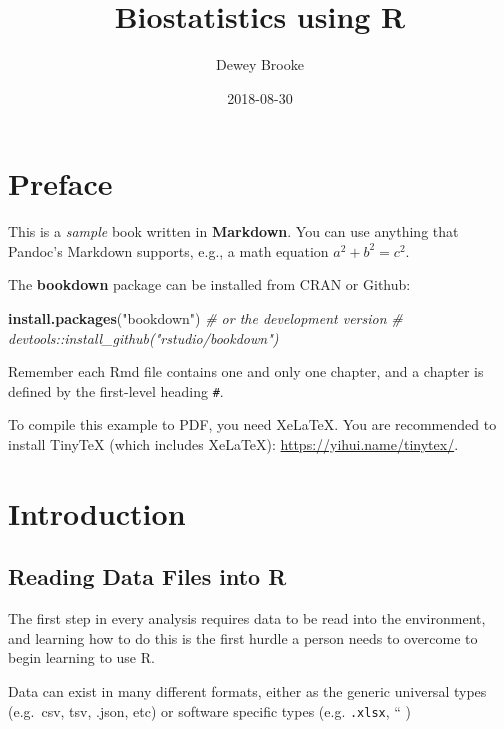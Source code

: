 \documentclass[12pt,]{article}
\title{Biostatistics using R}
\author{Dewey Brooke}
\date{2018-08-30}
\newenvironment{Shaded}{\begin{snugshade}}{\end{snugshade}}
\newcommand{\CommentTok}[1]{\textcolor[rgb]{0.56,0.35,0.01}{\textit{#1}}}
\newcommand{\KeywordTok}[1]{\textcolor[rgb]{0.13,0.29,0.53}{\textbf{#1}}}
\newcommand{\NormalTok}[1]{#1}
\newcommand{\StringTok}[1]{\textcolor[rgb]{0.31,0.60,0.02}{#1}}
\begin{document}
\maketitle

{
\hypersetup{linkcolor=black}
\setcounter{tocdepth}{2}
\tableofcontents
}
\listoftables
\listoffigures
\hypertarget{preface}{%
\section*{Preface}\label{preface}}

This is a \emph{sample} book written in \textbf{Markdown}. You can use
anything that Pandoc's Markdown supports, e.g., a math equation
\(a^2 + b^2 = c^2\).

The \textbf{bookdown} package can be installed from CRAN or Github:

\begin{Shaded}
\begin{Highlighting}[]
\KeywordTok{install.packages}\NormalTok{(}\StringTok{"bookdown"}\NormalTok{)}
\CommentTok{# or the development version}
\CommentTok{# devtools::install_github("rstudio/bookdown")}
\end{Highlighting}
\end{Shaded}

Remember each Rmd file contains one and only one chapter, and a chapter
is defined by the first-level heading \texttt{\#}.

To compile this example to PDF, you need XeLaTeX. You are recommended to
install TinyTeX (which includes XeLaTeX):
\url{https://yihui.name/tinytex/}.

\hypertarget{intro}{%
\section{Introduction}\label{intro}}

\hypertarget{reading-data-files-into-r}{%
\subsection*{Reading Data Files into
R}\label{reading-data-files-into-r}}

The first step in every analysis requires data to be read into the
environment, and learning how to do this is the first hurdle a person
needs to overcome to begin learning to use R.

Data can exist in many different formats, either as the generic
universal types (e.g.~csv, tsv, .json, etc) or software specific types
(e.g. \texttt{.xlsx}, `` )
\end{document}
